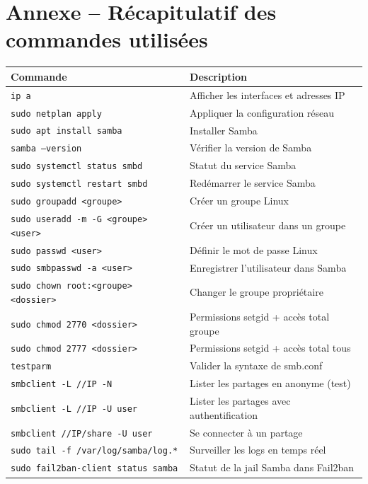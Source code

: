 \documentclass[12pt,a4paper]{article}
\begin{document}
\appendix
\section{Annexe -- Récapitulatif des commandes utilisées}

\begin{longtable}{ll}
  \toprule
  \textbf{Commande} & \textbf{Description} \\
  \midrule
  \endhead
  \texttt{ip a} & Afficher les interfaces et adresses IP \\
  \texttt{sudo netplan apply} & Appliquer la configuration réseau \\
  \texttt{sudo apt install samba} & Installer Samba \\
  \texttt{samba --version} & Vérifier la version de Samba \\
  \texttt{sudo systemctl status smbd} & Statut du service Samba \\
  \texttt{sudo systemctl restart smbd} & Redémarrer le service Samba \\
  \texttt{sudo groupadd <groupe>} & Créer un groupe Linux \\
  \texttt{sudo useradd -m -G <groupe> <user>} & Créer un utilisateur dans un groupe \\
  \texttt{sudo passwd <user>} & Définir le mot de passe Linux \\
  \texttt{sudo smbpasswd -a <user>} & Enregistrer l'utilisateur dans Samba \\
  \texttt{sudo chown root:<groupe> <dossier>} & Changer le groupe propriétaire \\
  \texttt{sudo chmod 2770 <dossier>} & Permissions setgid + accès total groupe \\
  \texttt{sudo chmod 2777 <dossier>} & Permissions setgid + accès total tous \\
  \texttt{testparm} & Valider la syntaxe de smb.conf \\
  \texttt{smbclient -L //IP -N} & Lister les partages en anonyme (test) \\
  \texttt{smbclient -L //IP -U user} & Lister les partages avec authentification \\
  \texttt{smbclient //IP/share -U user} & Se connecter à un partage \\
  \texttt{sudo tail -f /var/log/samba/log.*} & Surveiller les logs en temps réel \\
  \texttt{sudo fail2ban-client status samba} & Statut de la jail Samba dans Fail2ban \\

\end{longtable}
\end{document}
